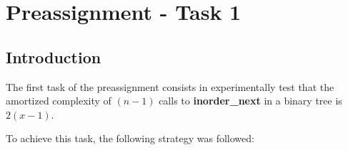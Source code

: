 \documentclass[12p]{report}
\begin{document}


  \newpage 				%



  \tableofcontents 			%



  \newpage 				%







  \chapter{Preassignment - Task 1}			%

 
  \section{Introduction}			%

  \large The first task of the preassignment consists in experimentally test that the amortized complexity of $(n-1)$ calls to \textbf {inorder\_next} in a binary tree is $2(x-1)$.

\bigskip

 \large To achieve this task, the following strategy was followed:
\end{document}
